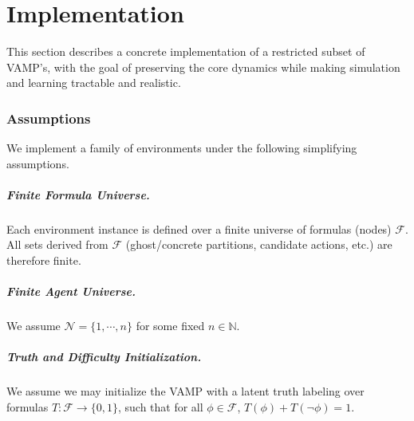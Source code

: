 \chapter{Implementation}\label{chap:implementation}
\renewcommand{\proves}{\vdash}

This section describes a concrete implementation of a restricted subset of VAMP's, with the goal of preserving the core dynamics while making simulation and learning tractable and realistic.

\subsection{Assumptions}

We implement a family of environments under the following simplifying assumptions.

\paragraph{Finite Formula Universe.}
Each environment instance is defined over a finite universe of formulas (nodes) $\mathcal{F}$.
All sets derived from $\mathcal{F}$ (ghost/concrete partitions, candidate actions, etc.)
are therefore finite.

\paragraph{Finite Agent Universe.}
We assume $\mathcal{N} = \{1,\cdots,n\}$ for some fixed $n \in \mathbb N$.


\paragraph{Truth and Difficulty Initialization.}

We assume we may initialize the VAMP with a latent truth labeling over formulas $T:\mathcal F\to\{0,1\}$, such that for all $\phi\in\mathcal F$, $T(\phi)+T(\neg\phi)=1$.


